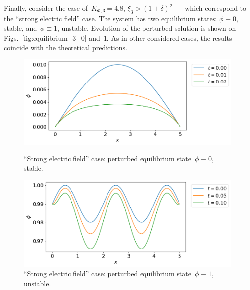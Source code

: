 Finally, consider the case of~$K_{\Phi, 3} = 4.8$, $\xi_3 > (1 +
\delta)^2$~--- which correspond to the ``strong electric field'' case.
The system has two equilibrium states: $\phi \equiv 0$, stable,
and~$\phi \equiv 1$, unstable.
Evolution of the perturbed solution is shown on
Figs.~\ref{fig:equilibrium_3_0} and~\ref{fig:equilibrium_3_1}.
As in other considered cases, the results coincide with the theoretical predictions.

\begin{figure}[!t]
  \centering
  \includegraphics[width=0.99\textwidth]{figures/equilibrium_3_0.png}
  \vspace{-0.3cm}
  \caption{``Strong electric field'' case: perturbed equilibrium
    state~$\phi \equiv 0$, stable.}
  \label{fig:equilibrium_3_0}
  \vspace{0.5cm}
  
  \includegraphics[width=0.99\textwidth]{figures/equilibrium_3_1.png}
  \vspace{-0.3cm}
  \caption{``Strong electric field'' case: perturbed equilibrium
    state~$\phi \equiv 1$, unstable.}
  \label{fig:equilibrium_3_1}
\end{figure}

\endinput
